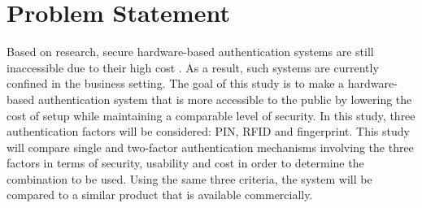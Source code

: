 \section{Problem Statement}
Based on research, secure hardware-based authentication systems are still inaccessible due to their high cost \cite{InfoSecurity2012}. As a result, such systems are currently confined in the business setting. The goal of this study is to make a hardware-based authentication system that is more accessible to the public by lowering the cost of setup while maintaining a comparable level of security. In this study, three authentication factors will be considered: PIN, RFID and fingerprint. This study will compare single and two-factor authentication mechanisms involving the three factors in terms of security, usability and cost in order to determine the combination to be used. Using the same three criteria, the system will be compared to a similar product that is available commercially.